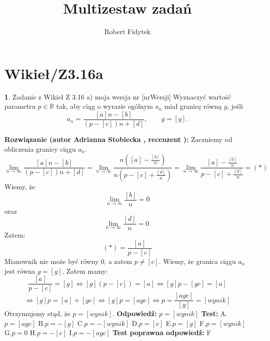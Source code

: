 \documentclass[12pt, a4paper]{article}
\title{Multizestaw zadań}
\author{Robert Fidytek}
\date{}
\theoremstyle{definition} %
\newtheorem{zad}{}
\newcommand{\kategoria}[1]{\section{#1}} %
\newcommand{\zadStart}[1]{\begin{zad}#1\newline} %
\newcommand{\zadStop}{\end{zad}}   %
\newcommand{\rozwStart}[2]{\noindent \textbf{Rozwiązanie (autor #1 , recenzent #2): }\newline} %
\newcommand{\rozwStop}{\newline}                                            %
\newcommand{\odpStart}{\noindent \textbf{Odpowiedź:}\newline}    %
\newcommand{\odpStop}{\newline}                                             %
\newcommand{\testStart}{\noindent \textbf{Test:}\newline} %
\newcommand{\testStop}{\newline} %
\newcommand{\kluczStart}{\noindent \textbf{Test poprawna odpowiedź:}\newline} %
\newcommand{\kluczStop}{\newline} %
\begin{document}
\maketitle


\kategoria{Wikieł/Z3.16a}
\zadStart{Zadanie z Wikieł Z 3.16 a) moja wersja nr [nrWersji]}
Wyznaczyć wartość parametru $p\in\mathbb{R}$ tak, aby ciąg o wyrazie ogólnym $a_n$ miał granicę równą $g$, jeśli
$$a_n=\frac{[a]n-[b]}{(p-[c])n+[d]},\qquad g=[g].$$
\zadStop
\rozwStart{Adrianna Stobiecka}{}
Zaczniemy od obliczenia granicy ciągu $a_n$.
$$\lim_{n\to\infty}\frac{[a]n-[b]}{(p-[c])n+[d]}=\lim_{n\to\infty}\frac{n([a]-\frac{[b]}{n})}{n(p-[c]+\frac{[d]}{n})}=\lim_{n\to\infty}\frac{[a]-\frac{[b]}{n}}{p-[c]+\frac{[d]}{n}}=(*)$$
Wiemy, że
$$\lim_{n\to\infty}\frac{[b]}{n}=0$$
oraz
$$\lim_{n\to\infty}\frac{[d]}{n}=0.$$
Zatem:
$$(*)=\frac{[a]}{p-[c]}$$
Mianownik nie może być równy $0$, a zatem $p\ne[c]$. Wiemy, że granica ciągu $a_n$ jest równa $g=[g]$. Zatem mamy:
$$\frac{[a]}{p-[c]}=[g]\Leftrightarrow [g](p-[c])=[a]\Leftrightarrow [g]p-[gc]=[a]$$
$$\Leftrightarrow[g]p=[a]+[gc]\Leftrightarrow[g]p=[agc]\Leftrightarrow p=\frac{[agc]}{[g]}=[wynik]$$
Otrzymujemy stąd, że $p=[wynik]$.
\rozwStop
\odpStart
$p=[wynik]$
\odpStop
\testStart
A.$p=[agc]$
B.$p=-[g]$
C.$p=-[wynik]$
D.$p=[c]$
E.$p=[g]$
F.$p=[wynik]$
G.$p=0$
H.$p=-[c]$
I.$p=-[agc]$
\testStop
\kluczStart
F
\kluczStop
\end{document}

